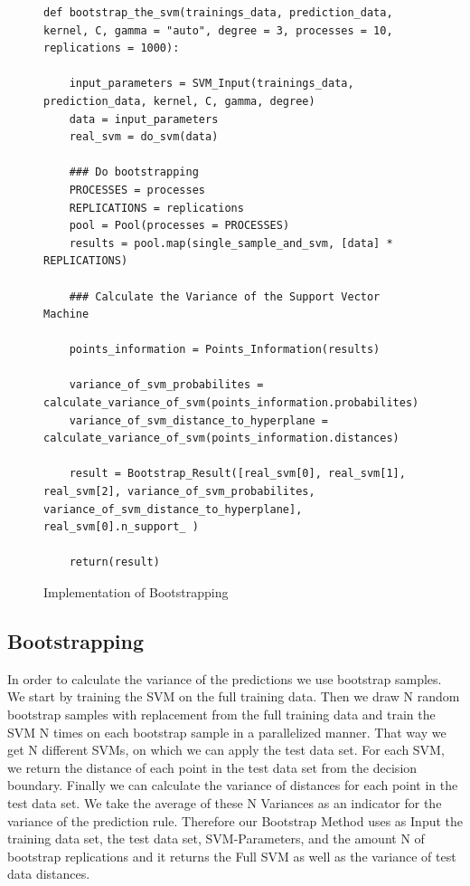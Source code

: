 \documentclass[letterpaper]{article}
\begin{document}
\begin{figure}[!htb]
\begin{center}
\begin{lstlisting}
def bootstrap_the_svm(trainings_data, prediction_data, kernel, C, gamma = "auto", degree = 3, processes = 10, replications = 1000):

    input_parameters = SVM_Input(trainings_data, prediction_data, kernel, C, gamma, degree)
    data = input_parameters
    real_svm = do_svm(data)
    
    ### Do bootstrapping
    PROCESSES = processes
    REPLICATIONS = replications
    pool = Pool(processes = PROCESSES)
    results = pool.map(single_sample_and_svm, [data] * REPLICATIONS)
        
    ### Calculate the Variance of the Support Vector Machine
    
    points_information = Points_Information(results)
    
    variance_of_svm_probabilites = calculate_variance_of_svm(points_information.probabilites)
    variance_of_svm_distance_to_hyperplane = calculate_variance_of_svm(points_information.distances)
    
    result = Bootstrap_Result([real_svm[0], real_svm[1], real_svm[2], variance_of_svm_probabilites, variance_of_svm_distance_to_hyperplane], real_svm[0].n_support_ )
        
    return(result)
\end{lstlisting}
\caption{Implementation of Bootstrapping}
\label{fig1}
\end{center}
\end{figure}
\subsection{Bootstrapping}
In order to calculate the variance of the predictions we use bootstrap samples. We start by training the SVM on the full training data. Then we draw N random bootstrap samples with replacement from the full training data and train the SVM N times on each bootstrap sample in a parallelized manner. That way we get N different SVMs, on which we can apply the test data set. For each SVM, we return the distance of each point in the test data set from the decision boundary.  Finally we can calculate the variance of distances for each point in the test data set. We take the average of these N Variances as an indicator for the variance of the prediction rule. Therefore our Bootstrap Method uses as Input the training data set, the test data set, SVM-Parameters, and the amount N of bootstrap replications and it returns the Full SVM as well as the variance of test data distances.
\end{document}

